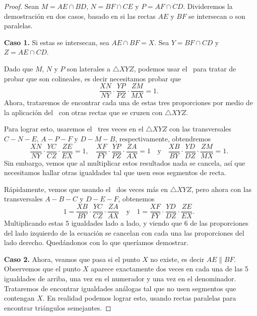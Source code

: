 \begin{proof}
    Sean $M = AE \cap BD$, $N = BF \cap CE$ y $P = AF \cap CD$.
    Divideremos la demostración en dos casos, basado en si las rectas $AE$ y $BF$ se intersecan o son paralelas.
    
    \textbf{Caso 1.}
    Si estas se intersecan, sea $AE \cap BF = X$.
    Sea $Y = BF \cap CD$ y $Z = AE \cap CD$.

    \begin{multicols}{2}
        \begin{figure}[H]
            \centering
            
        \end{figure}

        Dado que $M$, $N$ y $P$ son laterales a $\triangle XYZ$, podemos usar el~ para tratar de probar que son colineales, es decir necesitamos probar que
        \[
            \frac{XN}{NY} \cdot \frac{YP}{PZ} \cdot \frac{ZM}{MX} = 1.
        \]
        Ahora, trataremos de encontrar cada una de estas tres proporciones por medio de la aplicación del~ con otras rectas que se cruzen con $\triangle XYZ$.
    \end{multicols}

    Para lograr esto, usaremos el~ tres veces en el $\triangle XYZ$ con las transversales $C - N - E$, $A - P - F$ y $D - M - B$, respectivamente, obtendremos
    \[
        \frac{XN}{NY} \cdot \frac{YC}{CZ} \cdot \frac{ZE}{EX} = 1, \quad \frac{XF}{FY} \cdot \frac{YP}{PZ} \cdot \frac{ZA}{AX} = 1 \quad \text{y} \quad \frac{XB}{BY} \cdot \frac{YD}{DZ} \cdot \frac{ZM}{MX} = 1.
    \]
    Sin embargo, vemos que al multiplicar estos resultados nada se cancela, así que necesitamos hallar otras igualdades tal que usen esos segmentos de recta.

    Rápidamente, vemos que usando el~ dos veces más en $\triangle XYZ$, pero ahora con las transversales $A - B - C$ y $D - E - F$, obtenemos
    \[
        1 = \frac{XB}{BY} \cdot \frac{YC}{CZ} \cdot \frac{ZA}{AX} \quad \text{y} \quad 1 = \frac{XF}{FY} \cdot \frac{YD}{DZ} \cdot \frac{ZE}{EX}.
    \]
    Multiplicando estas 5 igualdades lado a lado, y viendo que 6 de las proporciones del lado izquierdo de la ecuación se cancelan con cada una las proporciones del lado derecho.
    Quedándonos con lo que queríamos demostrar.

    \textbf{Caso 2.}
    Ahora, veamos que pasa si el punto $X$ no existe, es decir $AE \parallel BF$.
    Observemos que el punto $X$ aparece exactamente dos veces en cada una de las 5 igualdades de arriba, una vez en el numerador y una vez en el denominador.
    Trataremos de encontrar igualdades análogas tal que no usen segmentos que contengan $X$.
    En realidad podemos lograr esto, usando rectas paralelas para encontrar triángulos semejantes.


\end{proof}
